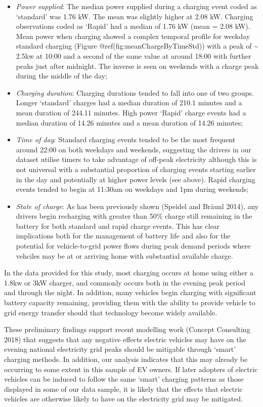 \documentclass[]{article}
\providecommand{\tightlist}{%
  \setlength{\itemsep}{0pt}\setlength{\parskip}{0pt}}
\begin{document}
\begin{itemize}
\tightlist
\item
  \emph{Power supplied}: The median power supplied during a charging event coded as `standard' was 1.76 kW. The mean was slightly higher at 2.08 kW. Charging observations coded as `Rapid' had a median of 1.76 kW (mean = 2.08 kW). Mean power when charging showed a complex temporal profile for weekday standard charging (Figure @ref(fig:meanChargeByTimeStd)) with a peak of \textasciitilde{} 2.5kw at 10:00 and a second of the same value at around 18:00 with further peaks just after midnight. The inverse is seen on weekends with a charge peak during the middle of the day;
\item
  \emph{Charging duration}: Charging durations tended to fall into one of two groups. Longer `standard' charges had a median duration of 210.1 minutes and a mean duration of 244.11 minutes. High power `Rapid' charge events had a median duration of 14.26 minutes and a mean duration of 14.26 minutes;
\item
  \emph{Time of day}: Standard charging events tended to be the most frequent around 22:00 on both weekdays and weekends, suggesting the drivers in our dataset utilise timers to take advantage of off-peak electricity although this is not universal with a substantial proportion of charging events starting earlier in the day and potentially at higher power levels (see above). Rapid charging events tended to begin at 11:30am on weekdays and 1pm during weekends;
\item
  \emph{State of charge}: As has been previously shown (Speidel and Bräunl 2014), any drivers begin recharging with greater than 50\% charge still remaining in the battery for both standard and rapid charge events. This has clear implications both for the management of battery life and also for the potential for vehicle-to-grid power flows during peak demand periods where vehciles may be at or arriving home with substantial available charge.
\end{itemize}

In the data provided for this study, most charging occurs at home using either a 1.8kw or 3kW charger, and commonly occurs both in the evening peak period and through the night. In addition, many vehicles begin charging with significant battery capacity remaining, providing them with the ability to provide vehicle to grid energy transfer should that technology become widely available.

These preliminary findings support recent modelling work (Concept Consulting 2018) that suggests that any negative effects electric vehicles may have on the evening national electricity grid peaks should be mitigable through `smart' charging methods. In addition, our analysis indicates that this may already be occurring to some extent in this sample of EV owners. If later adopters of electric vehicles can be induced to follow the same `smart' charging patterns as those displayed in some of our data sample, it is likely that the effects that electric vehicles are otherwise likely to have on the electricity grid may be mitigated.
\end{document}
